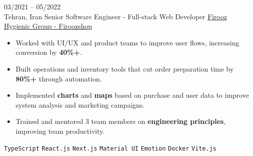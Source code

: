 \entry
{03/2021 -- 05/2022 \\ Tehran, Iran}
{Senior Software Engineer - Full-stack Web Developer}
{\href{https://firoozshop.com/}{Firooz Hygienic Group - Firoozshop}}
{\vspace{-10pt}
    \begin{itemize}[noitemsep,topsep=0pt,parsep=0pt,partopsep=0pt, leftmargin=-1pt]
        \item Worked with UI/UX and product teams to improve user flows, increasing conversion by \textbf{40\%+}.
        \item Built operations and inventory tools that cut order preparation time by \textbf{80\%+} through automation.
        \item Implemented \textbf{charts} and \textbf{maps} based on purchase and user data to improve system analysis and marketing campaigns.
        \item Trained and mentored 3 team members on \textbf{engineering principles}, improving team productivity.
    \end{itemize}
    \texttt{TypeScript} \slashsep \texttt{React.js} \slashsep \texttt{Next.js} \slashsep \texttt{Material UI} \slashsep \texttt{Emotion} \slashsep \texttt{Docker} \slashsep \texttt{Vite.js}
}
